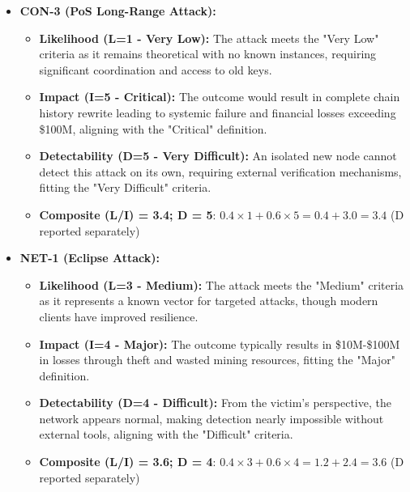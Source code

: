 \begin{itemize}
    \item \textbf{CON-3 (PoS Long-Range Attack):}
    \begin{itemize}
        \item \textbf{Likelihood (L=1 - Very Low):} The attack meets the "Very Low" criteria as it remains theoretical with no known instances, requiring significant coordination and access to old keys.
        \item \textbf{Impact (I=5 - Critical):} The outcome would result in complete chain history rewrite leading to systemic failure and financial losses exceeding \$100M, aligning with the "Critical" definition.
        \item \textbf{Detectability (D=5 - Very Difficult):} An isolated new node cannot detect this attack on its own, requiring external verification mechanisms, fitting the "Very Difficult" criteria.
        \item \textbf{Composite (L/I) = 3.4; D = 5}: $0.4 \times 1 + 0.6 \times 5 = 0.4 + 3.0 = 3.4$ (D reported separately)
    \end{itemize}

    \item \textbf{NET-1 (Eclipse Attack):}
    \begin{itemize}
        \item \textbf{Likelihood (L=3 - Medium):} The attack meets the "Medium" criteria as it represents a known vector for targeted attacks, though modern clients have improved resilience.
        \item \textbf{Impact (I=4 - Major):} The outcome typically results in \$10M-\$100M in losses through theft and wasted mining resources, fitting the "Major" definition.
        \item \textbf{Detectability (D=4 - Difficult):} From the victim's perspective, the network appears normal, making detection nearly impossible without external tools, aligning with the "Difficult" criteria.
        \item \textbf{Composite (L/I) = 3.6; D = 4}: $0.4 \times 3 + 0.6 \times 4 = 1.2 + 2.4 = 3.6$ (D reported separately)
    \end{itemize}
\end{itemize}